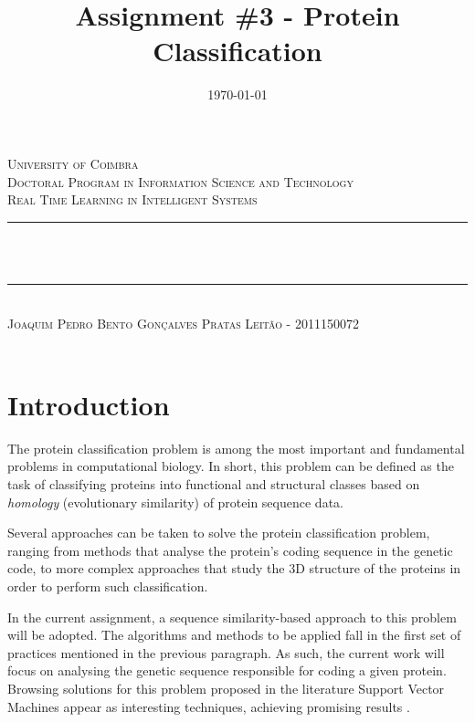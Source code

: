 \documentclass[11pt]{article}
\title{Assignment \#3 - Protein Classification}
\date{\today}
\makeatletter
\let\thetitle\@title
\let\thedate\@date
\makeatother
\begin{document}
	

\begin{titlepage}
	\centering
	\textsc{\LARGE University of Coimbra}\\[1.0 cm]
	\textsc{\large Doctoral Program in Information Science and Technology}\\[0.5 cm]
	\textsc{\large Real Time Learning in Intelligent Systems}\\[5 cm]
	\rule{\linewidth}{0.2 mm} \\[0.4 cm]
	{ \LARGE \bfseries \thetitle}\\ [0.2 cm]
	\rule{\linewidth}{0.2 mm} \\[3 cm]
	
	\textsc{Joaquim Pedro Bento Gonçalves Pratas Leitão - 2011150072}\\[5 cm]
	
	{\large \thedate}\\[2 cm]
	
	\vfill
	
\end{titlepage}

\tableofcontents

\newpage


\section{Introduction}
\label{introduction}

The protein classification problem is among the most important and fundamental problems in computational biology. In short, this problem can be defined as the task of classifying proteins into functional and structural classes based on \emph{homology} (evolutionary similarity) of protein sequence data.

Several approaches can be taken to solve the protein classification problem, ranging from methods that analyse the protein's coding sequence in the genetic code, to more complex approaches that study the 3D structure of the proteins in order to perform such classification.

In the current assignment, a sequence similarity-based approach to this problem will be adopted. The algorithms and methods to be applied fall in the first set of practices mentioned in the previous paragraph. As such, the current work will focus on analysing the genetic sequence responsible for coding a given protein. Browsing solutions for this problem proposed in the literature Support Vector Machines appear as interesting techniques, achieving promising results \cite{leslie2002mismatch, zavaljevski2002support, cai2003svm}.
\end{document}
